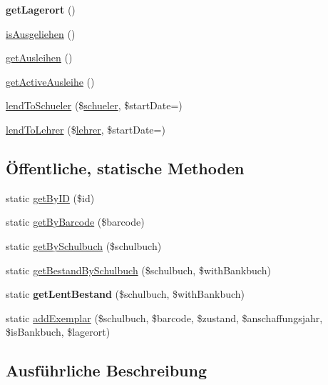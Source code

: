 \begin{DoxyCompactItemize}
{\bfseries get\+Lagerort} ()
\item 
\mbox{\hyperlink{class_exemplar_a0a8ec58fdeaf08fafbbaf75e04b8d8e4}{is\+Ausgeliehen}} ()
\item 
\mbox{\hyperlink{class_exemplar_a5f8f9bfa004e153aa958672c938dece9}{get\+Ausleihen}} ()
\item 
\mbox{\hyperlink{class_exemplar_afdf5cd68b1f49ccb86ad5dc5c898031e}{get\+Active\+Ausleihe}} ()
\item 
\mbox{\hyperlink{class_exemplar_ac413b03ee7276a2220533575142320c0}{lend\+To\+Schueler}} (\$\mbox{\hyperlink{classschueler}{schueler}}, \$start\+Date=\textquotesingle{}\textquotesingle{})
\item 
\mbox{\hyperlink{class_exemplar_a58d65f4745f391fa885d6094357ac08e}{lend\+To\+Lehrer}} (\$\mbox{\hyperlink{classlehrer}{lehrer}}, \$start\+Date=\textquotesingle{}\textquotesingle{})
\end{DoxyCompactItemize}
\subsection*{Öffentliche, statische Methoden}
\begin{DoxyCompactItemize}
\item 
static \mbox{\hyperlink{class_exemplar_ad738af1ad88e971c599d2365c572c2ba}{get\+By\+ID}} (\$id)
\item 
static \mbox{\hyperlink{class_exemplar_a91081a317d95fa65aa30f7a4edd2de50}{get\+By\+Barcode}} (\$barcode)
\item 
static \mbox{\hyperlink{class_exemplar_a0803f8a7d209491b1ad4ed6e3acb9c6b}{get\+By\+Schulbuch}} (\$schulbuch)
\item 
static \mbox{\hyperlink{class_exemplar_a8d1c60ff17290739c77bf2c17cec4ff7}{get\+Bestand\+By\+Schulbuch}} (\$schulbuch, \$with\+Bankbuch)
\item 
\mbox{\label{class_exemplar_aa6621e920a59a130ff8ac4e57e457672}} 
static {\bfseries get\+Lent\+Bestand} (\$schulbuch, \$with\+Bankbuch)
\item 
static \mbox{\hyperlink{class_exemplar_aed8b02986848a49f42ad90e9a43870b9}{add\+Exemplar}} (\$schulbuch, \$barcode, \$zustand, \$anschaffungsjahr, \$is\+Bankbuch, \$lagerort)
\end{DoxyCompactItemize}


\subsection{Ausführliche Beschreibung}


